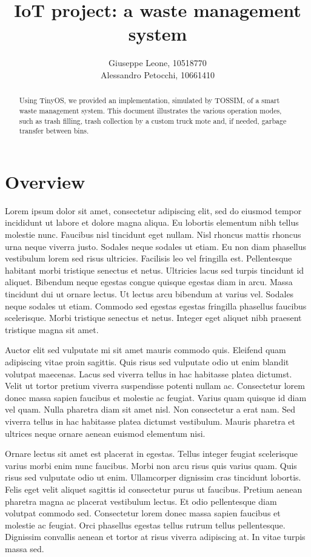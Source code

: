 \documentclass[]{article}
\title{IoT project: a waste management system}
\author{Giuseppe Leone, 10518770 \\ Alessandro Petocchi, 10661410}
\date{}
\begin{document}
\maketitle

\begin{abstract}
	\noindent Using TinyOS, we provided an implementation, simulated by TOSSIM, of a smart waste management system. This document illustrates the various operation modes, such as trash filling, trash collection by a custom truck mote and, if needed, garbage transfer between bins. 
\end{abstract}

\section{Overview}
Lorem ipsum dolor sit amet, consectetur adipiscing elit, sed do eiusmod tempor incididunt ut labore et dolore magna aliqua. Eu lobortis elementum nibh tellus molestie nunc. Faucibus nisl tincidunt eget nullam. Nisl rhoncus mattis rhoncus urna neque viverra justo. Sodales neque sodales ut etiam. Eu non diam phasellus vestibulum lorem sed risus ultricies. Facilisis leo vel fringilla est. Pellentesque habitant morbi tristique senectus et netus. Ultricies lacus sed turpis tincidunt id aliquet. Bibendum neque egestas congue quisque egestas diam in arcu. Massa tincidunt dui ut ornare lectus. Ut lectus arcu bibendum at varius vel. Sodales neque sodales ut etiam. Commodo sed egestas egestas fringilla phasellus faucibus scelerisque. Morbi tristique senectus et netus. Integer eget aliquet nibh praesent tristique magna sit amet.

Auctor elit sed vulputate mi sit amet mauris commodo quis. Eleifend quam adipiscing vitae proin sagittis. Quis risus sed vulputate odio ut enim blandit volutpat maecenas. Lacus sed viverra tellus in hac habitasse platea dictumst. Velit ut tortor pretium viverra suspendisse potenti nullam ac. Consectetur lorem donec massa sapien faucibus et molestie ac feugiat. Varius quam quisque id diam vel quam. Nulla pharetra diam sit amet nisl. Non consectetur a erat nam. Sed viverra tellus in hac habitasse platea dictumst vestibulum. Mauris pharetra et ultrices neque ornare aenean euismod elementum nisi.

Ornare lectus sit amet est placerat in egestas. Tellus integer feugiat scelerisque varius morbi enim nunc faucibus. Morbi non arcu risus quis varius quam. Quis risus sed vulputate odio ut enim. Ullamcorper dignissim cras tincidunt lobortis. Felis eget velit aliquet sagittis id consectetur purus ut faucibus. Pretium aenean pharetra magna ac placerat vestibulum lectus. Et odio pellentesque diam volutpat commodo sed. Consectetur lorem donec massa sapien faucibus et molestie ac feugiat. Orci phasellus egestas tellus rutrum tellus pellentesque. Dignissim convallis aenean et tortor at risus viverra adipiscing at. In vitae turpis massa sed.
\end{document}
